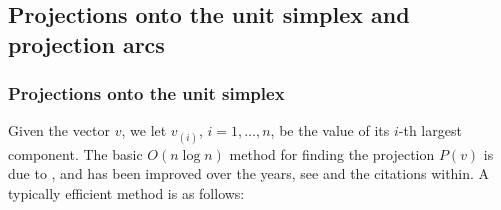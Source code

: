 \documentclass[12pt,twoside]{article}
\begin{document}
\subsection{Projections onto the unit simplex and projection arcs}

\subsubsection{Projections onto the unit simplex}

Given the vector $v$, we let $v_{(i)}$, $i = 1,\ldots,n$,
be the value of its $i$-th largest component.
The basic $O(n\log n)$ method for finding the projection $P(v)$ is due to
\cite{HeldWolfCrow74:mp}, and has been improved over the
years, see \cite{Cond16:mp,DaiChen22,BergFrie08:sisc} and the citations within.
A typically efficient method is as follows:
\newpage





\end{document}
